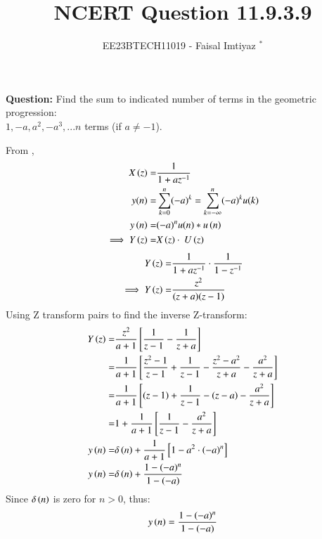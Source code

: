 \documentclass[journal,12pt,twocolumn]{IEEEtran}
\theoremstyle{remark}
\begin{document}

\vspace{3cm}
\title{NCERT Question 11.9.3.9}
\author{EE23BTECH11019 - Faisal Imtiyaz $^{*}$%
}
\maketitle
\newpage
\bigskip

\renewcommand{\thefigure}{\arabic{figure}}
\renewcommand{\thetable}{\arabic{table}}


\vspace{3cm}
\textbf{Question:} Find the sum to indicated number of terms in the geometric progression:\\
$1,-a, a^2, -a^3,...n$ terms (if $a\neq-1$).\\
\solution

\newline
From ,
\begin{align}
X\left(z\right) =& \frac{1}{1+az^{-1}}\\
y(n) =& \sum_{k=0}^{n} (-a)^k = \sum_{k=-\infty}^{n} (-a)^k u(k) \\
y\left(n\right)= &{(-a)^n}u(n)*u\left(n\right)\\
\implies Y\left(z\right)= &X\left(z\right)\cdot\ U\left(z\right)
\end{align}
\begin{align}
    Y\left(z\right) = &\frac{1}{1+az^{-1}}\cdot\frac{1}{1-z^{-1}}\\
    \implies Y\left(z\right) = &\frac{z^{2}}{(z+a)(z-1)}
\end{align}
Using Z transform pairs  to find the inverse Z-transform:\\
\begin{align}
    Y\left(z\right)=& \frac{z^{2}}{a+1}{}\left[\frac{1}{z-1} - \frac{1}{z+a}\right]\\
    =& \frac{1}{a+1}{}\left[\frac{z^{2}-1}{z-1}+\frac{1}{z-1} -\frac{z^{2}-a^{2}}{z+a} -\frac{a^{2}}{z+a}\right] \\
    =& \frac{1}{a+1}{}\left[(z-1)+\frac{1}{z-1}-(z-a)-\frac{a^{2}}{z+a}\right]\\
    =& 1+\frac{1}{a+1}{}\left[\frac{1}{z-1}-\frac{a^{2}}{z+a}\right]\\
    y\left(n\right) =& \delta\left(n\right) + \frac{1}{a+1}{}\left[1- a^{2}\cdot(-a)^{n}\right]\\
    y\left(n\right) =& \delta\left(n\right)+ \frac{1-(-a)^{n}}{1-(-a)}\\
\end{align}
Since $\delta\left(n\right)$ is zero for $n>0$, thus:
\begin{align}
    y\left(n\right)=\frac{1-(-a)^{n}}{1-(-a)}\\
\end{align}
\end{document}
